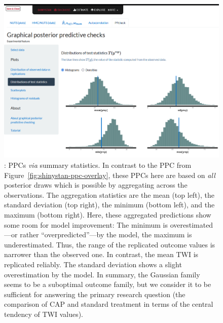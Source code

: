 \begin{figure}[t!]
  \centering
  \includegraphics[width=\textwidth]{Figures/shinystan_PPC_stats.png}
  \caption[: PPCs (statistics)]{: PPCs \textit{via}
  summary statistics.
  In contrast to the PPC from Figure~\ref{fig:shinystan-ppc-overlay}, these PPCs here
  are based on \emph{all} posterior draws which is possible by aggregating across the
  observations. The aggregation statistics are the mean (top left), the standard
  deviation (top right), the minimum (bottom left), and the maximum (bottom right).
  Here, these aggregated predictions show some room for model improvement: The minimum
  is overestimated---or rather ``overpredicted''---by the model, the maximum is
  underestimated. Thus, the range of the replicated outcome values is narrower than
  the observed one. In contrast, the mean TWI is replicated reliably. The standard
  deviation shows a slight overestimation by the model. In summary, the Gaussian
  family seems to be a suboptimal outcome family, but we consider it to be sufficient
  for answering the primary research question (the comparison of CAP and standard
  treatment in terms of the central tendency of TWI values).}
  \label{fig:shinystan-ppc-stat}
\end{figure}%
